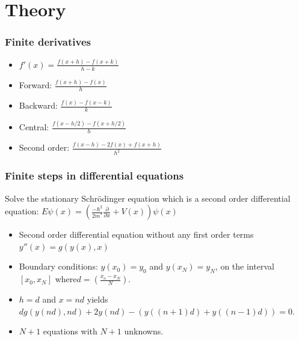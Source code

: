 \documentclass[•]{beamer}
\theoremstyle{remark}
\begin{document}
\section{Theory}

\begin{frame}\frametitle{Finite derivatives}
\begin{block}

\begin{itemize}
\item $f'(x) =\frac{f(x+h)-f(x+k)}{h-k}$
\pause
\item Forward: $\frac{f(x+h)-f(x)}{h}$
\pause
\item Backward: $\frac{f(x)-f(x-k)}{k}$
\pause
\item Central: $\frac{f(x-h/2)-f(x+h/2)}{h}$
\pause
\item Second order: $\frac{f(x-h)- 2f(x) +f(x+h)}{h^2}$
\end{itemize}
\end{block}
\end{frame}

\begin{frame}\frametitle{Finite steps in differential equations}
\begin{block}

Solve the stationary Schr\"odinger equation which is a second order differential equation:\pause
$ E \psi (x) = (\frac{-\hbar ^2}{2m^*} \frac{\partial}{\partial x} +V(x)) \psi (x)$
\pause
\begin{itemize}
\item Second order differential equation without any first order terms $y''(x) = g(y(x),x)$
\pause
\item Boundary conditions: $y(x_{0}) = y_{0}$ and $y(x_{N}) = y_{N}$, on the interval $[x_{0},x_{N}]$ where$ d = (\frac{x_{o}-x_{N}}{N})$.
\pause
\item $h = d$ and $x = nd$  yields $dg(y(nd),nd) + 2y(nd)-(y((n+1)d)+y((n-1)d)) = 0$.

\item  $N+1$ equations with $N+1$ unknowns.
\end{itemize}
\end{block}
\end{frame}
\end{document}
